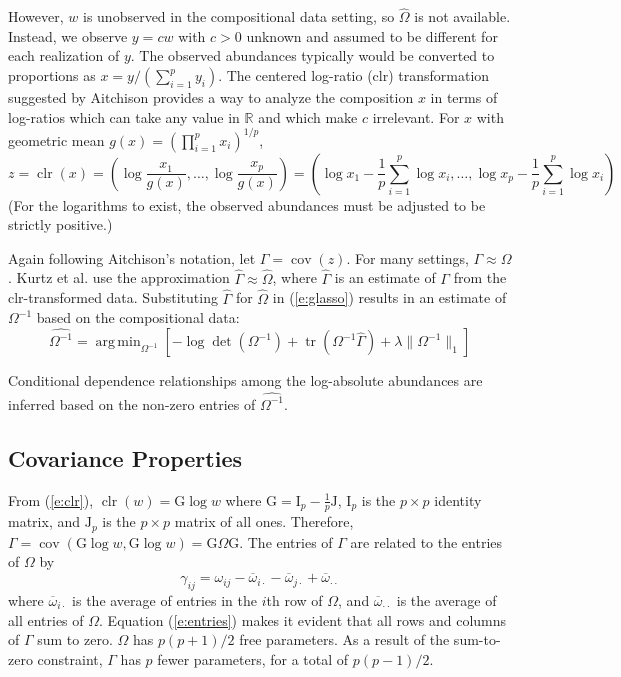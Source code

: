 \documentclass[10pt]{article}
\newcommand{\clr}{\operatorname{clr}}
\newcommand{\cov}{\operatorname{cov}}
\DeclareMathOperator*{\argmin}{arg\,min}
\DeclareMathOperator{\tr}{tr}
\begin{document}
However, $w$ is unobserved in the compositional data setting, so $\hat{\Omega}$ is not available. Instead, we observe $y = cw$ with $c>0$ unknown and assumed to be different for each realization of $y$. The observed abundances typically would be converted to proportions as $x = y / (\sum_{i=1}^p y_i)$. The centered log-ratio (clr) transformation suggested by Aitchison provides a way to analyze the composition $x$ in terms of log-ratios which can take any value in $\mathbb{R}$ and which make $c$ irrelevant. For $x$ with geometric mean $g(x) = \left(\prod_{i=1}^p x_i\right)^{1/p}$,
\begin{equation}
\label{e:clr}
z = \clr(x) = \left( \log \frac{x_1}{g(x)}, \dots, \log \frac{x_p}{g(x)} \right) = \left( \log x_1 - \frac{1}{p} \sum_{i=1}^p \log x_i, \dots, \log x_p - \frac{1}{p} \sum_{i=1}^p \log x_i \right)
\end{equation}
(For the logarithms to exist, the observed abundances must be adjusted to be strictly positive.)

Again following Aitchison's notation, let $\Gamma = \cov(z)$. For many settings, $\Gamma \approx \Omega$. Kurtz et al. \citeyear{kurtz} use the approximation $\hat{\Gamma} \approx \hat{\Omega}$, where $\hat{\Gamma}$ is an estimate of $\Gamma$ from the clr-transformed data. Substituting $\hat{\Gamma}$ for $\hat{\Omega}$ in (\ref{e:glasso}) results in an estimate of $\Omega^{-1}$ based on the compositional data:
\begin{equation}
\widehat{\Omega^{-1}} = \argmin_{\Omega^{-1}} \left[ -\log \det(\Omega^{-1}) + \tr(\Omega^{-1} \hat{\Gamma}) + \lambda \lVert \Omega^{-1} \rVert_1 \right]
\end{equation}

Conditional dependence relationships among the log-absolute abundances are inferred based on the non-zero entries of $\widehat{\Omega^{-1}}$.

\subsection*{Covariance Properties}

From (\ref{e:clr}), $\clr(w) = \mathrm{G} \log w$ where $\mathrm{G} = \mathrm{I}_p - \frac{1}{p}\mathrm{J}$, $\mathrm{I}_p$ is the $p \times p$ identity matrix, and $\mathrm{J}_p$ is the $p \times p$ matrix of all ones. Therefore, $\Gamma = \cov(\mathrm{G} \log w, \mathrm{G} \log w) = \mathrm{G} \Omega \mathrm{G}$. The entries of $\Gamma$ are related to the entries of $\Omega$ by
\begin{equation}
\label{e:entries}
\gamma_{ij} = \omega_{ij} - \overline{\omega}_{i\cdot} - \overline{\omega}_{j\cdot} + \overline{\omega}_{\cdot\cdot}
\end{equation}
where $\overline{\omega}_{i\cdot}$ is the average of entries in the $i$th row of $\Omega$, and $\overline{\omega}_{\cdot\cdot}$ is the average of all entries of $\Omega$. Equation (\ref{e:entries}) makes it evident that all rows and columns of $\Gamma$ sum to zero. $\Omega$ has $p(p+1)/2$ free parameters. As a result of the sum-to-zero constraint, $\Gamma$ has $p$ fewer parameters, for a total of $p(p-1)/2$.
\end{document}
